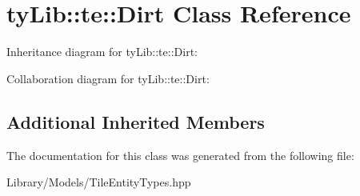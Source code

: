 \hypertarget{classty_lib_1_1te_1_1_dirt}{}\section{ty\+Lib\+:\+:te\+:\+:Dirt Class Reference}
\label{classty_lib_1_1te_1_1_dirt}


Inheritance diagram for ty\+Lib\+:\+:te\+:\+:Dirt\+:


Collaboration diagram for ty\+Lib\+:\+:te\+:\+:Dirt\+:
\subsection*{Additional Inherited Members}


The documentation for this class was generated from the following file\+:\begin{DoxyCompactItemize}
\item 
Library/\+Models/Tile\+Entity\+Types.\+hpp\end{DoxyCompactItemize}
